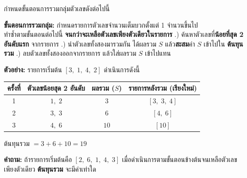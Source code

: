 \question กำหนดขั้นตอนการรวมกลุ่มตัวเลขดังต่อไปนี้

\begin{pseudocode}
\textbf{ขั้นตอนการรวมกลุ่ม:} กำหนดรายการตัวเลขจำนวนเต็มบวกตั้งแต่ 1 จำนวนขึ้นไป \\
ทำซ้ำตามขั้นตอนต่อไปนี้ \textbf{จนกว่าจะเหลือตัวเลขเพียงตัวเดียวในรายการ}
\newline
.) ค้นหาตัวเลขที่\textbf{น้อยที่สุด 2 อันดับแรก} จากรายการ
\newline
.) นำตัวเลขทั้งสองมารวมกัน ได้ผลรวม $S$ แล้ว\textbf{สะสม}ค่า $S$ เข้าไปใน \textbf{ต้นทุนรวม}
\newline
.) ลบตัวเลขทั้งสองออกจากรายการ แล้วใส่ผลรวม $S$ เข้าไปแทน
\end{pseudocode}

\newline
\textbf{ตัวอย่าง:} รายการเริ่มต้น $[3,\; 1,\; 4,\; 2]$ ดำเนินการดังนี้

\begin{center}
\begin{tabular}{c|c|c|c}
\textbf{ครั้งที่} & \textbf{ตัวเลขน้อยสุด 2 อันดับ} & \textbf{ผลรวม ($S$)} & \textbf{รายการหลังรวม (เรียงใหม่)} \\
\hline
1 & $1,\; 2$ & $3$ & $[3,\; 3,\; 4]$ \\
2 & $3,\; 3$ & $6$ & $[4,\; 6]$ \\
3 & $4,\; 6$ & $10$ & $[10]$ \\
\end{tabular}
\end{center}

ต้นทุนรวม $= 3 + 6 + 10 = 19$

\newline
\textbf{คำถาม:} ถ้ารายการเริ่มต้นคือ $[2,\; 6,\; 1,\; 4,\; 3]$ เมื่อดำเนินการตามขั้นตอนข้างต้นจนเหลือตัวเลขเพียงตัวเดียว \textbf{ต้นทุนรวม} จะมีค่าเท่าใด


